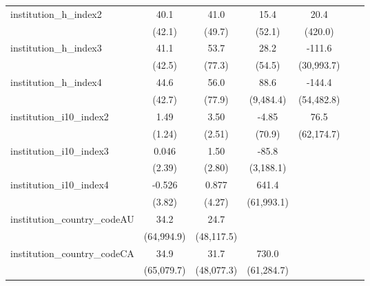 \begin{tabular}{lcccccc}
   institution\_h\_index2                & 40.1         & 41.0         & 15.4         & 20.4          &            &   \\   
                                         & (42.1)       & (49.7)       & (52.1)       & (420.0)       &            &   \\   
   institution\_h\_index3                & 41.1         & 53.7         & 28.2         & -111.6        &            &   \\   
                                         & (42.5)       & (77.3)       & (54.5)       & (30,993.7)    &            &   \\   
   institution\_h\_index4                & 44.6         & 56.0         & 88.6         & -144.4        &            &   \\   
                                         & (42.7)       & (77.9)       & (9,484.4)    & (54,482.8)    &            &   \\   
   institution\_i10\_index2              & 1.49         & 3.50         & -4.85        & 76.5          &            &   \\   
                                         & (1.24)       & (2.51)       & (70.9)       & (62,174.7)    &            &   \\   
   institution\_i10\_index3              & 0.046        & 1.50         & -85.8        &               &            &   \\   
                                         & (2.39)       & (2.80)       & (3,188.1)    &               &            &   \\   
   institution\_i10\_index4              & -0.526       & 0.877        & 641.4        &               &            &   \\   
                                         & (3.82)       & (4.27)       & (61,993.1)   &               &            &   \\   
   institution\_country\_codeAU          & 34.2         & 24.7         &              &               &            &   \\   
                                         & (64,994.9)   & (48,117.5)   &              &               &            &   \\   
   institution\_country\_codeCA          & 34.9         & 31.7         & 730.0        &               &            &   \\   
                                         & (65,079.7)   & (48,077.3)   & (61,284.7)   &               &            &   \\   

\end{tabular}
